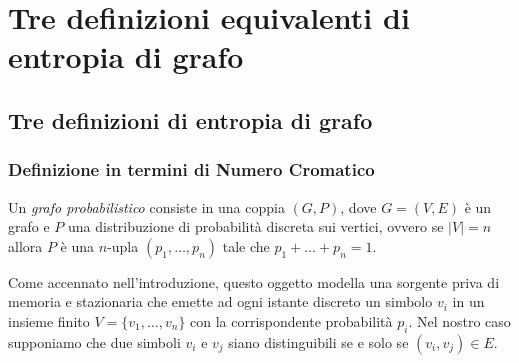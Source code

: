 \chapter{Tre definizioni equivalenti di entropia di grafo} 
\section{Tre definizioni di entropia di grafo} 
\subsection{Definizione in termini di Numero Cromatico} \label{codinganalogy} 
\begin{definition}
  Un \emph{grafo probabilistico} consiste in una coppia \((G,P)\), dove \(G=(V,E)\) è un grafo e \(P\) una distribuzione di probabilità discreta sui vertici, ovvero se \(|V|=n\) allora \(P\) è una \(n\)-upla \((p_1,\dots ,p_n)\) tale che \(p_1 + \dots + p_n = 1\). 
\end{definition}
Come accennato nell'introduzione, questo oggetto modella una sorgente priva di memoria e stazionaria che emette ad ogni istante discreto un simbolo \(v_i\) in un insieme finito \(V=\{v_1,\dots ,v_n\}\) con la corrispondente probabilità \(p_i\). Nel nostro caso supponiamo che due simboli \(v_i\) e \(v_j\) siano distinguibili se e solo se \((v_i, v_j) \in E\).

